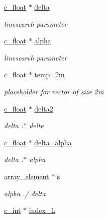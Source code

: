 \begin{Indent}
\begin{DoxyCompactItemize}
\mbox{\hyperlink{global__opts_8h_a7f1a9fda95e52979658c20a0d134fb15}{c\+\_\+float}} $\ast$ \mbox{\hyperlink{structQPALMWorkspace_a21bf2ea2cefa8eea9b7c4575d4dbca51}{delta}}
\begin{DoxyCompactList}\small\item\em linesearch parameter \end{DoxyCompactList}\item 
\mbox{\hyperlink{global__opts_8h_a7f1a9fda95e52979658c20a0d134fb15}{c\+\_\+float}} $\ast$ \mbox{\hyperlink{structQPALMWorkspace_ad2b7da5ef7accd9881a0c65240cc2b36}{alpha}}
\begin{DoxyCompactList}\small\item\em linesearch parameter \end{DoxyCompactList}\item 
\mbox{\hyperlink{global__opts_8h_a7f1a9fda95e52979658c20a0d134fb15}{c\+\_\+float}} $\ast$ \mbox{\hyperlink{structQPALMWorkspace_ae351edb296d6959659a578a265c3af8a}{temp\+\_\+2m}}
\begin{DoxyCompactList}\small\item\em placeholder for vector of size 2m \end{DoxyCompactList}\item 
\mbox{\hyperlink{global__opts_8h_a7f1a9fda95e52979658c20a0d134fb15}{c\+\_\+float}} $\ast$ \mbox{\hyperlink{structQPALMWorkspace_a2bd4914a52d02e2b11c56863976bb5ff}{delta2}}
\begin{DoxyCompactList}\small\item\em delta .$\ast$ delta \end{DoxyCompactList}\item 
\mbox{\hyperlink{global__opts_8h_a7f1a9fda95e52979658c20a0d134fb15}{c\+\_\+float}} $\ast$ \mbox{\hyperlink{structQPALMWorkspace_a68f6c37d8ac59bda4e2fad32e3935d99}{delta\+\_\+alpha}}
\begin{DoxyCompactList}\small\item\em delta .$\ast$ alpha \end{DoxyCompactList}\item 
\mbox{\hyperlink{structarray__element}{array\+\_\+element}} $\ast$ \mbox{\hyperlink{structQPALMWorkspace_a6428bf5b44e920828469514559b93de8}{s}}
\begin{DoxyCompactList}\small\item\em alpha ./ delta \end{DoxyCompactList}\item 
\mbox{\hyperlink{global__opts_8h_aa3217a0f49d3e52b74e9dd830c44472f}{c\+\_\+int}} $\ast$ \mbox{\hyperlink{structQPALMWorkspace_af1a5130d10eac6f1cca4e989592cffe4}{index\+\_\+L}}

\end{DoxyCompactItemize}
\end{Indent}
